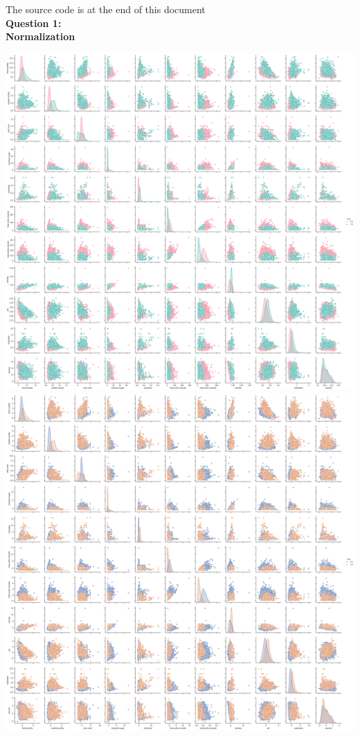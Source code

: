 \documentclass[12pt]{article}
\begin{document}
\noindent
{\LARGE The source code is at the end of this document}\\
\textbf{\large Question 1:}\\
\textbf{Normalization}
\begin{center}
    \includegraphics[width=17cm]{Q1_no_normalization.png}
    \includegraphics[width=17cm]{Q1_zscore_normalization.png}
\end{center}
\end{document}
